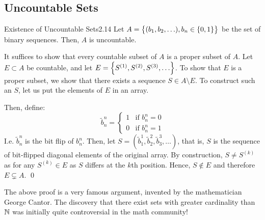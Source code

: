 \subsection{Uncountable Sets}
\begin{theorem}{Existence of Uncountable Sets}{2.14}
Let $A = \set{(b_1, b_2, \ldots), b_n \in \set{0, 1}}$ be the set of binary sequences. Then, $A$ is uncountable. 
\end{theorem}
\begin{nproof}
    It suffices to show that every countable subset of $A$ is a proper subset of $A$. Let $E \subset A$ be countable, and let $E = \set{S^{(1)}, S^{(2)}, S^{(3)}, \ldots}$. To show that $E$ is a proper subset, we show that there exists a sequence $S \in A \setminus E$. To construct such an $S$, let us put the elements of $E$ in an array. 
    \begin{center}
    \end{center}
    Then, define:
    \[\tilde{b}_n^n = \begin{cases}
        1 & \text{if $b_n^n = 0$}
        \\ 0 & \text{if $b_n^n = 1$}
    \end{cases}\]
    I.e. $\tilde{b}_n^n$ is the bit flip of $b_n^n$. Then, let $S = (\tilde{b}_1^1, \tilde{b}_2^2, \tilde{b}_3^3, \ldots)$, that is, $S$ is the sequence of bit-flipped diagonal elements of the original array. By construction, $S \neq S^{(k)}$ as for any $S^{(k)} \in E$ as $S$ differs at the $k$th position. Hence, $S \notin E$ and therefore $E \subsetneq A$. \qed
\end{nproof}
\noindent The above proof is a very famous argument, invented by the mathematician George Cantor. The discovery that there exist sets with greater cardinality than $\mathbb{N}$ was initially quite controversial in the math community!

